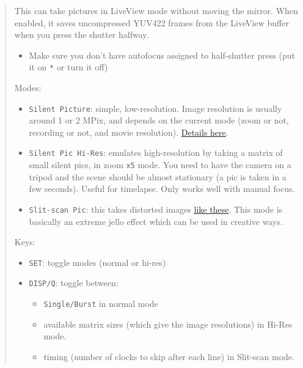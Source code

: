 \documentclass[a4paper,english]{article}
\begin{document}
\begin{quote}

This can take pictures in LiveView mode without moving the mirror. When enabled, it saves uncompressed YUV422 frames from the LiveView buffer when you press the shutter halfway.
%
\begin{itemize}

\item Make sure you don't have autofocus assigned to half-shutter press (put it on \texttt{*} or turn it off)

\end{itemize}

Modes:
%
\begin{itemize}

\item \texttt{Silent Picture}: simple, low-resolution. Image resolution is usually around 1 or 2 MPix, and depends on the current mode (zoom or not, recording or not, and movie resolution). \href{http://magiclantern.wikia.com/wiki/VRAM/550D\#0x44000080}{Details here}.

\item \texttt{Silent Pic Hi-Res}: emulates high-resolution by taking a matrix of small silent pics, in zoom \texttt{x5} mode. You need to have the camera on a tripod and the scene should be almost stationary (a pic is taken in a few seconds). Useful for timelapse. Only works well with manual focus.

\item \texttt{Slit-scan Pic}: this takes distorted images \href{http://people.rit.edu/andpph/text-slit-scan.html}{like these}. This mode is basically an extreme jello effect which can be used in creative ways.

\end{itemize}

Keys:
%
\begin{itemize}

\item \texttt{SET}: toggle modes (normal or hi-res)

\item \texttt{DISP/Q}: toggle between:
%
\begin{itemize}

\item \texttt{Single/Burst} in normal mode

\item available matrix sizes (which give the image resolutions) in Hi-Res mode.

\item timing (number of clocks to skip after each line) in Slit-scan mode.


\end{itemize}
\end{itemize}
\end{quote}
\end{document}
